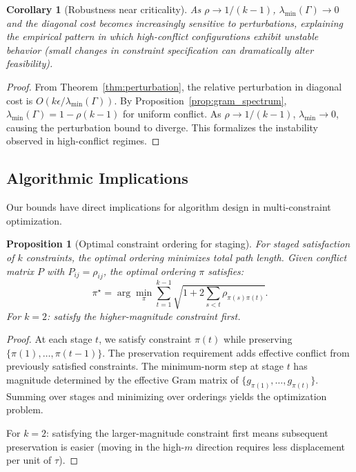 \documentclass{article}
\theoremstyle{plain}
\newtheorem{proposition}[theorem]{Proposition}
\newtheorem{corollary}[theorem]{Corollary}
\theoremstyle{definition}
\theoremstyle{remark}
\begin{document}
\begin{corollary}[Robustness near criticality]
As $\rho \to 1/(k-1)$, $\lambda_{\min}(\Gamma) \to 0$ and the diagonal cost becomes increasingly sensitive to perturbations, explaining the empirical pattern in which high-conflict configurations exhibit unstable behavior (small changes in constraint specification can dramatically alter feasibility).
\end{corollary}

\begin{proof}
From Theorem~\ref{thm:perturbation}, the relative perturbation in diagonal cost is $O(k\epsilon/\lambda_{\min}(\Gamma))$. By Proposition~\ref{prop:gram_spectrum}, $\lambda_{\min}(\Gamma) = 1 - \rho(k-1)$ for uniform conflict. As $\rho \to 1/(k-1)$, $\lambda_{\min} \to 0$, causing the perturbation bound to diverge. This formalizes the instability observed in high-conflict regimes.
\end{proof}

\subsection{Algorithmic Implications}\label{app:algorithm}

Our bounds have direct implications for algorithm design in multi-constraint optimization.

\begin{proposition}[Optimal constraint ordering for staging]
For staged satisfaction of $k$ constraints, the optimal ordering minimizes total path length. Given conflict matrix $P$ with $P_{ij} = \rho_{ij}$, the optimal ordering $\pi$ satisfies:
\[
\pi^\star = \arg\min_\pi \sum_{t=1}^{k-1} \sqrt{1 + 2\sum_{s<t} \rho_{\pi(s)\pi(t)}}.
\]
For $k=2$: satisfy the higher-magnitude constraint first.
\end{proposition}

\begin{proof}
At each stage $t$, we satisfy constraint $\pi(t)$ while preserving $\{\pi(1), \ldots, \pi(t-1)\}$. The preservation requirement adds effective conflict from previously satisfied constraints. The minimum-norm step at stage $t$ has magnitude determined by the effective Gram matrix of $\{g_{\pi(1)}, \ldots, g_{\pi(t)}\}$. Summing over stages and minimizing over orderings yields the optimization problem.

For $k=2$: satisfying the larger-magnitude constraint first means subsequent preservation is easier (moving in the high-$m$ direction requires less displacement per unit of $\tau$).
\end{proof}
\end{document}
